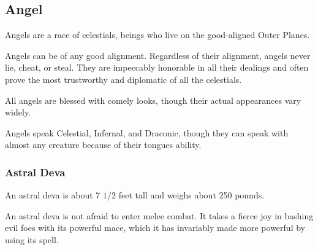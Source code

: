 \subsection{Angel}
\label{sec:Angel}
Angels are a race of celestials, beings who live on the good-aligned Outer Planes.

Angels can be of any good alignment. Regardless of their alignment, angels never lie, cheat, or steal. They are impeccably honorable in all their dealings and often prove the most trustworthy and diplomatic of all the celestials.

All angels are blessed with comely looks, though their actual appearances vary widely.

Angels speak Celestial, Infernal, and Draconic, though they can speak with almost any creature because of their tongues ability. 
\subsubsection{Astral Deva}
An astral deva is about 7 $1/2$ feet tall and weighs about 250 pounds. 

An astral deva is not afraid to enter melee combat. It takes a fierce joy in bashing evil foes with its powerful mace, which it has invariably made more powerful by using its  spell. 

